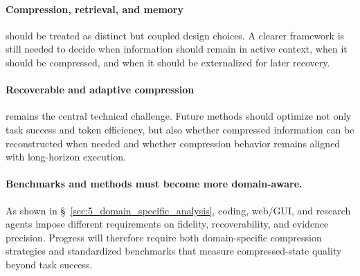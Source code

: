 \paragraph{Compression, retrieval, and memory} should be treated as distinct but coupled design choices. A clearer framework is still needed to decide when information should remain in active context, when it should be compressed, and when it should be externalized for later recovery.

\paragraph{Recoverable and adaptive compression} remains the central technical challenge. Future methods should optimize not only task success and token efficiency, but also whether compressed information can be reconstructed when needed and whether compression behavior remains aligned with long-horizon execution.

\paragraph{Benchmarks and methods must become more domain-aware.} As shown in \S~\ref{sec:5_domain_specific_analysis}, coding, web/GUI, and research agents impose different requirements on fidelity, recoverability, and evidence precision. Progress will therefore require both domain-specific compression strategies and standardized benchmarks that measure compressed-state quality beyond task success.
